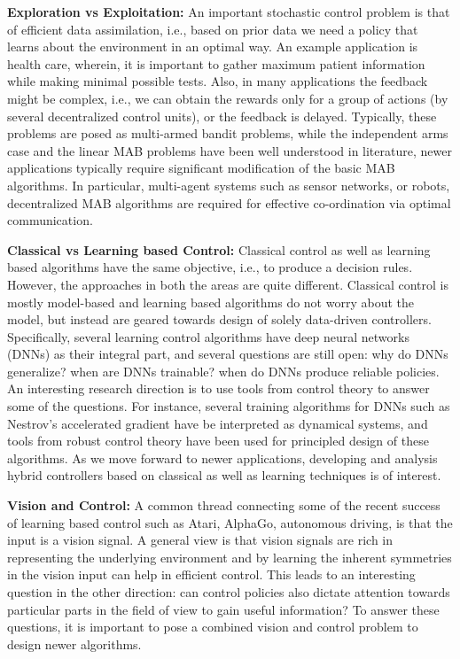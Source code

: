 \documentclass[onecolumn,12pt]{IEEEtran}
\begin{document}
 \textbf{Exploration vs Exploitation:} An important stochastic control problem is that of efficient data assimilation, i.e., based on prior data we need a policy that learns about the environment in an optimal way. An example application is health care, wherein, it is important to gather maximum patient information while making minimal possible tests. Also, in many applications the feedback might be complex, i.e., we can obtain the rewards only for a group of actions (by several decentralized control units), or the feedback is delayed. Typically, these problems are posed as multi-armed bandit problems, while the independent arms case and the linear MAB problems have been well understood in literature, newer applications typically require significant modification of the basic MAB algorithms. In particular, multi-agent systems such as sensor networks, or robots, decentralized MAB algorithms are required for effective co-ordination via optimal communication.
 
 \textbf{Classical vs Learning based Control:} Classical control as well as learning based algorithms have the same objective, i.e., to produce a decision rules. However, the approaches in both the areas are quite different. Classical control is mostly model-based and learning based algorithms do not worry about the model, but instead are geared towards design of solely data-driven controllers. Specifically, several learning control algorithms have deep neural networks (DNNs) as their integral part, and several questions are still open: why do DNNs generalize? when are DNNs trainable? when do DNNs produce reliable policies. An interesting research direction is to use tools from control theory to answer some of the questions. For instance, several training algorithms for DNNs such as Nestrov's accelerated gradient have be interpreted as dynamical systems, and tools from robust control theory have been used for principled design of these algorithms. As we move forward to newer applications, developing and analysis hybrid controllers based on classical as well as learning techniques is of interest.
 
 \textbf{Vision and Control:} A common thread connecting some of the recent success of learning based control such as Atari, AlphaGo, autonomous driving, is that the input is a vision signal.  A general view is that vision signals are rich in representing the underlying environment and by learning the inherent symmetries in the vision input can help in efficient control. This leads to an interesting question in the other direction: can control policies also dictate attention towards particular parts in the field of view to gain useful information? To answer these questions, it is important to pose a combined vision and control problem to design newer algorithms.
 
\end{document}
